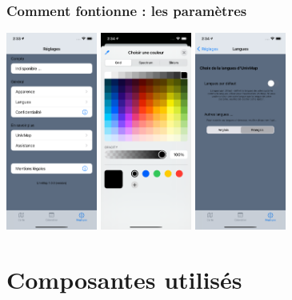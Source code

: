 \documentclass{beamer}
\begin{document}
  \begin{frame}
    \frametitle{Comment fontionne : les paramètres}
    \begin{center}
      \includegraphics[width=30mm, scale=0.5]{setting.png}
      \includegraphics[width=30mm, scale=0.5]{setting_appearance.png}
      \includegraphics[width=30mm, scale=0.5]{setting_languageOff.png}
    \end{center}
  \end{frame}
%
%
\section{Composantes utilisés}
%
%
\end{document}
